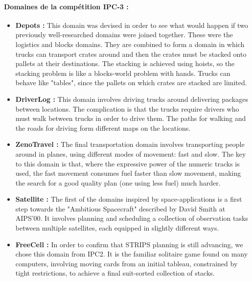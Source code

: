 \paragraph*{Domaines de la compétition IPC-3 :}
\begin{itemize}
\item \textbf{Depots :}
{\color{red}This domain was devised in order to see what would happen if two previously well-researched domains were joined together. These were the logistics and blocks domains. They are combined to form a domain in which trucks can transport crates around and then the crates must be stacked onto pallets at their destinations. The stacking is achieved using hoists, so the stacking problem is like a blocks-world problem with hands. Trucks can behave like "tables", since the pallets on which crates are stacked are limited.}
\item \textbf{DriverLog :}
{\color{red}This domain involves driving trucks around delivering packages between locations. The complication is that the trucks require drivers who must walk between trucks in order to drive them. The paths for walking and the roads for driving form different maps on the locations.}
\item \textbf{ZenoTravel :}
{\color{red}The final transportation domain involves transporting people around in planes, using different modes of movement: fast and slow. The key to this domain is that, where the expressive power of the numeric tracks is used, the fast movement consumes fuel faster than slow movement, making the search for a good quality plan (one using less fuel) much harder.}
\item \textbf{Satellite :}
{\color{red}The first of the domains inspired by space-applications is a first step towards the "Ambitious Spacecraft" described by David Smith at AIPS'00. It involves planning and scheduling a collection of observation tasks between multiple satellites, each equipped in slightly different ways.}
\item \textbf{FreeCell :}
{\color{red}In order to confirm that STRIPS planning is still advancing, we chose this domain from IPC2. It is the familiar solitaire game found on many computers, involving moving cards from an initial tableau, constrained by tight restrictions, to achieve a final suit-sorted collection of stacks.}
\end{itemize}

